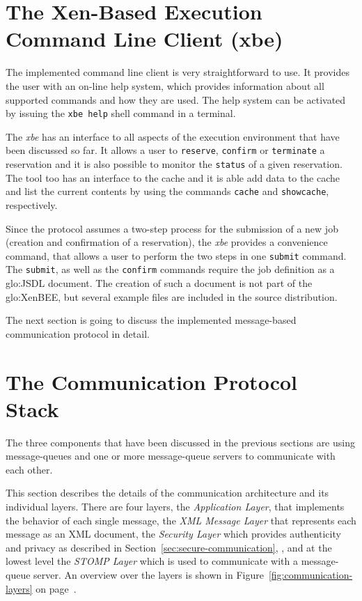 \section[The Xen-Based Execution Command Line Client]{The Xen-Based Execution
  Command Line Client (xbe)}
\label{sec:command-line-client}

The implemented  command line  client is very  straightforward to  use. It
provides the user with an  on-line help system, which provides information
about all supported commands and how they are used. The help system can be
activated by issuing the \texttt{xbe help} shell command in a terminal.

The  \emph{xbe}  has  an  interface   to  all  aspects  of  the  execution
environment  that  have been  discussed  so far.   It  allows  a user  to
\texttt{reserve}, \texttt{confirm} or \texttt{terminate} a reservation and
it  is   also  possible  to   monitor  the  \texttt{status}  of   a  given
reservation. The tool too has an interface to the cache and it is able add
data to  the cache  and list  the current contents  by using  the commands
\texttt{cache} and \texttt{showcache}, respectively.

Since the protocol assumes a two-step  process for the submission of a new
job  (\ie creation  and  confirmation of  a  reservation), the  \emph{xbe}
provides a  convenience command,  that allows a  user to perform  the two
steps in one \texttt{submit} command.  The \texttt{submit}, as well as the
\texttt{confirm} commands  require the job definition  as a \gls{glo:JSDL}
document.   The  creation   of  such  a  document  is   not  part  of  the
\gls{glo:XenBEE},  but several example  files are  included in  the source
distribution.

\medskip

The  next  section  is  going  to discuss  the  implemented  message-based
communication protocol in detail.

\section{The Communication Protocol Stack}
\label{sec:communication-protocol}

The three components that have been discussed in the previous sections are
using message-queues and one  or more message-queue servers to communicate
with each other.

This section  describes the details of the  communication architecture and
its  individual  layers.  There  are  four  layers, the  \emph{Application
  Layer},  that  implements  the  behavior  of each  single  message,  the
\emph{XML Message Layer} that represents  each message as an XML document,
the  \emph{Security  Layer} which  provides  authenticity  and privacy  as
described            in            Section~\ref{sec:secure-communication},
\emph{},  and at  the  lowest level  the
\emph{STOMP  Layer} which  is  used to  communicate  with a  message-queue
server.     An     overview    over    the    layers     is    shown    in
Figure~\ref{fig:communication-layers}                                    on
page~\pageref{fig:communication-layers}.

